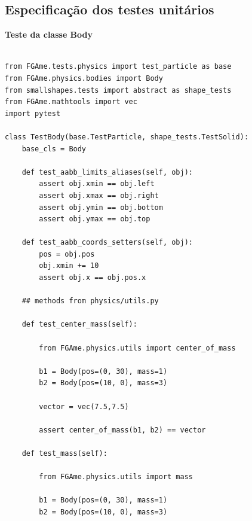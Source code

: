 \pagestyle{empty}


\begin{anexosenv}

\partanexos

\chapter{Especificação dos testes unitários}
\label{sec:anexo1}

{\LARGE \textbf{Teste da classe Body}}

\begin{lstlisting}

from FGAme.tests.physics import test_particle as base
from FGAme.physics.bodies import Body
from smallshapes.tests import abstract as shape_tests
from FGAme.mathtools import vec
import pytest

class TestBody(base.TestParticle, shape_tests.TestSolid):
    base_cls = Body

    def test_aabb_limits_aliases(self, obj):
        assert obj.xmin == obj.left
        assert obj.xmax == obj.right
        assert obj.ymin == obj.bottom
        assert obj.ymax == obj.top

    def test_aabb_coords_setters(self, obj):
        pos = obj.pos
        obj.xmin += 10
        assert obj.x == obj.pos.x

    ## methods from physics/utils.py

    def test_center_mass(self):

        from FGAme.physics.utils import center_of_mass

        b1 = Body(pos=(0, 30), mass=1)
        b2 = Body(pos=(10, 0), mass=3)

        vector = vec(7.5,7.5)

        assert center_of_mass(b1, b2) == vector

    def test_mass(self):

        from FGAme.physics.utils import mass

        b1 = Body(pos=(0, 30), mass=1)
        b2 = Body(pos=(10, 0), mass=3)


\end{lstlisting}
\end{anexosenv}
